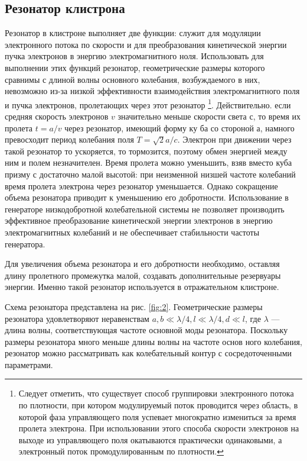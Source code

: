 \subsection{Резонатор клистрона}

Резонатор в клистроне выполняет две функции: служит для модуляции электронного потока по скорости и для преобразования кинетической энергии пучка электронов в энергию электромагнитного ноля. Использовать для выполнении этих функций резонатор, геометрические размеры которого сравнимы с длиной волны основного колебания, возбуждаемого в них, невозможно из-за низкой эффективности взаимодействия электромагнитного поля и пучка электронов, пролетающих через этот резонатор
\footnote{Следует отметить, что существует способ группировки электронного потока по плотности, при котором модулируемый поток проводится через область, в которой фаза управляющего поля успевает многократно измениться за время пролета электрона. При использовании этого способа скорости электронов на выходе из управляющего поля окатываются практически одинаковыми, а электронный поток промодулированным по плотности.}. Действительно. если средняя скорость электронов $v$ значительно меньше скорости света $с$, то время их пролета $t = a/v$ через резонатор, имеющий форму ку­ ба со стороной а, намного превосходит период колебания поля $T =\sqrt{2}a/c$. Электрон при движении через такой резонатор то ускоряется, то тормозится, поэтому обмен энергией между ним и полем незначителен. Время пролета можно уменьшить, взяв вместо куба призму с достаточно малой высотой:
при неизменной низшей частоте колебаний время пролета электрона через резонатор уменьшается. Однако сокращение объема резонатора приводит к
уменьшению его добротности. Использование в генераторе низкодобротной колебательной системы не позволяет производить эффективное преобразование кинетической энергии электронов в энергию электромагнитных колебаний и не обеспечивает стабильности частоты генератора.

Для увеличения объема резонатора и его добротности необходимо, оставляя длину пролетного промежутка малой, создавать дополнительные резервуары энергии. Именно такой резонатор используется в отражательном клистроне.

Схема резонатора представлена на рис. \ref{fig:2}. Геометрические размеры резонатора удовлетворяют неравенствам $a,b \ll \lambda /4,l \ll \lambda /4,d \ll l$, где $\lambda$ — длина волны, соответствующая частоте основной моды резонатора. По­скольку размеры резонатора много меньше длины волны на частоте основ­
ного колебания, резонатор можно рассматривать как колебательный контур с сосредоточенными параметрами.

